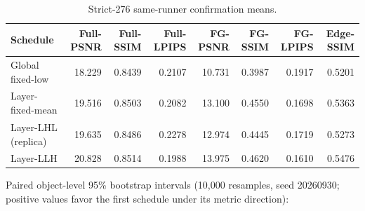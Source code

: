 \documentclass[10pt]{article}
\begin{document}
\begin{table}[h]
\centering\small
\caption{Strict-276 same-runner confirmation means.}
\begin{tabular}{lrrrrrrr}
\toprule
Schedule & Full-PSNR & Full-SSIM & Full-LPIPS & FG-PSNR & FG-SSIM & FG-LPIPS & Edge-SSIM \\
\midrule
Global fixed-low & 18.229 & 0.8439 & 0.2107 & 10.731 & 0.3987 & 0.1917 & 0.5201 \\
Layer-fixed-mean & 19.516 & 0.8503 & 0.2082 & 13.100 & 0.4550 & 0.1698 & 0.5363 \\
Layer-LHL (replica) & 19.635 & 0.8486 & 0.2278 & 12.974 & 0.4445 & 0.1719 & 0.5273 \\
Layer-LLH & 20.828 & 0.8514 & 0.1988 & 13.975 & 0.4620 & 0.1610 & 0.5476 \\
\bottomrule
\end{tabular}
\end{table}

Paired object-level 95\% bootstrap intervals (10,000 resamples, seed
20260930; positive values favor the first schedule under its metric
direction):
\end{document}
